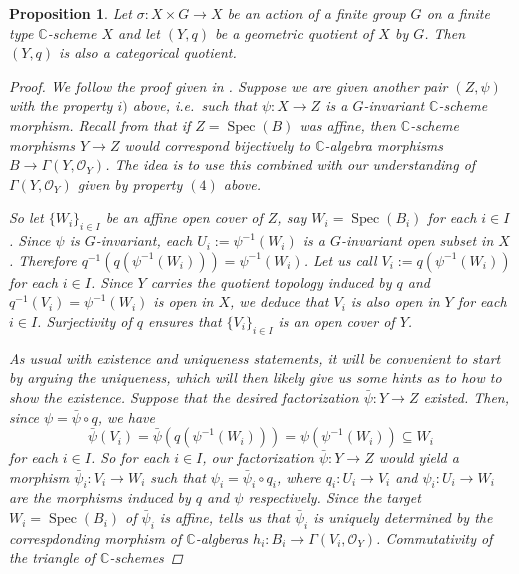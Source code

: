 \documentclass[12pt,a4paper]{amsart}
\theoremstyle{plain}
\newtheorem{prop}[thm]{Proposition}
\theoremstyle{definition}
\theoremstyle{remark}
\begin{document}
\begin{prop}
  Let $\sigma \colon X \times G \to X$ be an action of a finite group $G$ on a finite type $\mathbb{C}$-scheme $X$ and let $(Y, q)$ be a geometric quotient of $X$ by $G$.
  Then $(Y, q)$ is also a categorical quotient.

  \begin{proof}
    We follow the proof given in \cite[Proposition 0.1]{mfk94}.
    Suppose we are given another pair $(Z, \psi)$ with the property $i)$ above, i.e.~such that $\psi \colon X \to Z$ is a $G$-invariant $\mathbb{C}$-scheme morphism.
    Recall from \cite[Exercise II.2.4]{har77} that if $Z = \operatorname{Spec}(B)$ was affine, then $\mathbb{C}$-scheme morphisms $Y \to Z$ would correspond bijectively to $\mathbb{C}$-algebra morphisms $B \to \Gamma(Y,\mathscr{O}_{Y})$.
    The idea is to use this combined with our understanding of $\Gamma(Y,\mathscr{O}_{Y})$ given by property $(4)$ above.

    So let $\{ W_{i} \}_{i \in I}$ be an affine open cover of $Z$, say $W_{i} = \operatorname{Spec}(B_{i})$ for each $i \in I$.
    Since $\psi$ is $G$-invariant, each $U_{i} := \psi^{-1}(W_{i})$ is a $G$-invariant open subset in $X$.
    Therefore $q^{-1}(q(\psi^{-1}(W_{i}))) = \psi^{-1}(W_{i})$.
    Let us call $V_{i} := q(\psi^{-1}(W_{i}))$ for each $i \in I$.
    Since $Y$ carries the quotient topology induced by $q$ and $q^{-1}(V_{i}) = \psi^{-1}(W_{i})$ is open in $X$, we deduce that $V_{i}$ is also open in $Y$ for each $i \in I$.
    Surjectivity of $q$ ensures that $\{ V_{i} \}_{i \in I}$ is an open cover of $Y$.

    As usual with existence and uniqueness statements, it will be convenient to start by arguing the uniqueness, which will then likely give us some hints as to how to show the existence.
    Suppose that the desired factorization $\bar{\psi} \colon Y \to Z$ existed.
    Then, since $\psi = \bar{\psi} \circ q$, we have
    \[ \bar{\psi}(V_{i}) = \bar{\psi}(q(\psi^{-1}(W_{i}))) = \psi(\psi^{-1}(W_{i})) \subseteq W_{i} \]
    for each $i \in I$.
    So for each $i \in I$, our factorization $\bar{\psi} \colon Y \to Z$ would yield a morphism $\bar{\psi}_{i} \colon V_{i} \to W_{i}$ such that $\psi_{i} = \bar{\psi}_{i} \circ q_{i}$, where $q_{i} \colon U_{i} \to V_{i}$ and $\psi_{i} \colon U_{i} \to W_{i}$ are the morphisms induced by $q$ and $\psi$ respectively.
    Since the target $W_{i} = \operatorname{Spec}(B_{i})$ of $\bar{\psi}_{i}$ is affine, \cite[Exercise II.2.4]{har77} tells us that $\bar{\psi}_{i}$ is uniquely determined by the correspdonding morphism of $\mathbb{C}$-algberas $h_{i} \colon B_{i} \to \Gamma(V_{i}, \mathscr{O}_{Y})$.
    Commutativity of the triangle of $\mathbb{C}$-schemes
    

\end{proof}
\end{prop}
\end{document}
